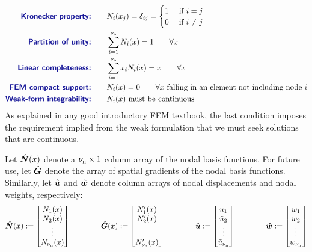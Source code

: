\begin{subequations}
\begin{align}
\text{\Defn{Kronecker property:}}\qquad&
\NBF_i(x_j)=\delta_{ij}=\begin{cases}
                                1 &\text{ if }i=j
                                \\
                                0 & \text{ if }i\ne j
                         \end{cases}
\label{eq:oneDRequirementsOnShapeFnsKronecker}
\\
\text{\Defn{Partition of unity:}}\qquad&
\sum\limits_{i=1}^\numnodes \NBF_i(x)=1     \qquad\forall x
\\
\text{\Defn{Linear completeness:}}\qquad&
\sum\limits_{i=1}^\numnodes x_i\NBF_i(x)=x     \qquad\forall x
\\
\text{\Defn{FEM compact support:}}\qquad&
\NBF_i(x)=0 \qquad\forall x 
\text{ falling in an element not including node $i$}
\label{eq:oneDRequirementsOnShapeFnsFEMsupport}
\\
\text{\Defn{Weak-form integrability:}}\qquad&
\NBF_i(x)\text{ must be continuous}
\label{eq:oneDRequirementsOnShapeFnsFEMcontinuity}
\end{align}
\label{eq:oneDRequirementsOnShapeFns}
\end{subequations}
As explained in any good introductory FEM textbook, the last condition imposes the requirement implied from the weak formulation that we must seek solutions that are continuous.

\renewcommand{\gradNBFa}{\Array{G}}
Let $\hat{\bm{N}}(x)$ denote a 
${\nu_\text{n}}\times1$ column array of the nodal basis functions. For future use, let $\gradNBFa$ denote the array of spatial gradients of the nodal basis functions. Similarly, 
let $\hat{\bm{u}}$ and $\hat{\bm{w}}$ denote \numnodes{} column arrays of nodal displacements and nodal weights, respectively:
\begin{equation}
  \NBFa(x)\definedEqual\begin{bmatrix}\NBF_1(x)\\ \NBF_2(x) \\ \vdots \\ \NBF_\numnodes(x)\end{bmatrix}
\qquad\qquad
  \gradNBFa(x)\definedEqual\begin{bmatrix}\NBF_1'(x)\\ \NBF_2'(x) \\ \vdots \\ \NBF_\numnodes'(x)\end{bmatrix}
\qquad\qquad
  \Array{u}\definedEqual\begin{bmatrix} \aprx{u}_1\\ \aprx{u}_2 \\ \vdots \\ \aprx{u}_\numnodes\end{bmatrix}
\qquad\qquad
  \Array{w}\definedEqual\begin{bmatrix}w_1\\ w_2 \\ \vdots \\ w_\numnodes\end{bmatrix}
\end{equation}

